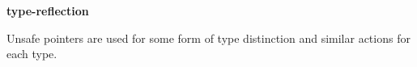 


\textbf{type-reflection}

Unsafe pointers are used for some form of type distinction and similar actions for each type.




%
%
%
%
%
%
%
%
%
%
%
%
%
%
%
%
%

